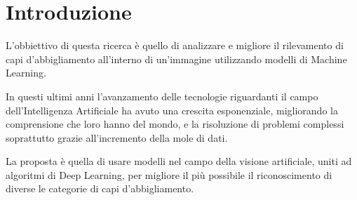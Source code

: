 \chapter{Introduzione}
L'obbiettivo di questa ricerca è quello di analizzare e migliore il rilevamento di capi d'abbigliamento all'interno di un'immagine utilizzando modelli di Machine Learning.

In questi ultimi anni l'avanzamento delle tecnologie riguardanti il campo dell'Intelligenza Artificiale ha
avuto una crescita esponenziale, migliorando la comprensione che loro hanno del mondo, e la risoluzione di problemi complessi soprattutto grazie all'incremento della mole di dati.

La proposta è quella di usare modelli nel campo della visione artificiale, uniti ad algoritmi di Deep Learning, per migliore il più possibile il riconoscimento di diverse le categorie di capi d'abbigliamento.